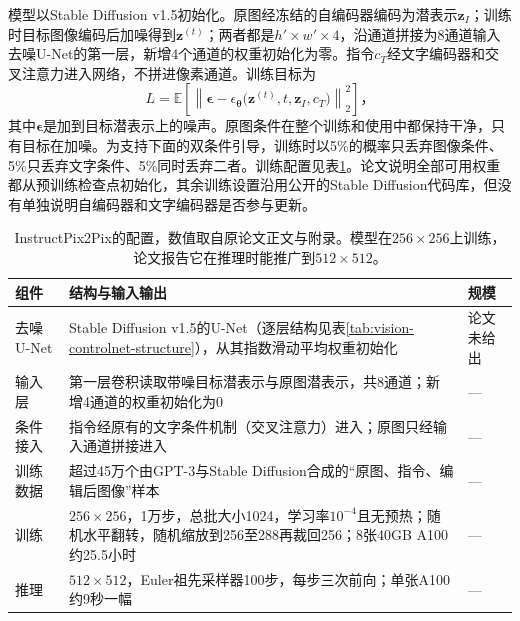 模型以Stable Diffusion v1.5初始化。原图经冻结的自编码器编码为潜表示$\bm{z}_I$；训练时目标图像编码后加噪得到$\bm{z}^{(t)}$；两者都是$h'\times w'\times4$，沿通道拼接为8通道输入去噪U-Net的第一层，新增4个通道的权重初始化为零。指令$c_T$经文字编码器和交叉注意力进入网络，不拼进像素通道。训练目标为
\begin{equation}
 L=\mathbb{E}\!\left[
 \left\lVert\bm{\epsilon}-
 \epsilon_{\bm{\theta}}
   \bigl(\bm{z}^{(t)},t,\bm{z}_I,c_T\bigr)
 \right\rVert_2^2\right]\text{，}
 \label{eq:vision-instruct-training}
\end{equation}
其中$\bm{\epsilon}$是加到目标潜表示上的噪声。原图条件在整个训练和使用中都保持干净，只有目标在加噪。为支持下面的双条件引导，训练时以5\%的概率只丢弃图像条件、5\%只丢弃文字条件、5\%同时丢弃二者。训练配置见表\ref{tab:vision-instruct-config}。论文说明全部可用权重都从预训练检查点初始化，其余训练设置沿用公开的Stable Diffusion代码库，但没有单独说明自编码器和文字编码器是否参与更新。

\begin{table}[htbp]
 \centering
 \small
 \begin{tabularx}{\linewidth}{@{}p{24mm}Xp{20mm}@{}}
  \toprule
  组件 & 结构与输入输出 & 规模\\
  \midrule
  去噪U-Net & Stable Diffusion v1.5的U-Net（逐层结构见表\ref{tab:vision-controlnet-structure}），从其指数滑动平均权重初始化 & 论文未给出\\
  输入层 & 第一层卷积读取带噪目标潜表示与原图潜表示，共8通道；新增4通道的权重初始化为0 & —\\
  条件接入 & 指令经原有的文字条件机制（交叉注意力）进入；原图只经输入通道拼接进入 & —\\
  训练数据 & 超过45万个由GPT-3与Stable Diffusion合成的“原图、指令、编辑后图像”样本 & —\\
  训练 & $256\times256$，1万步，总批大小1024，学习率$10^{-4}$且无预热；随机水平翻转，随机缩放到256至288再裁回256；8张40GB A100约25.5小时 & —\\
  推理 & $512\times512$，Euler祖先采样器100步，每步三次前向；单张A100约9秒一幅 & —\\
  \bottomrule
 \end{tabularx}
 \caption{InstructPix2Pix的配置，数值取自原论文正文与附录。模型在$256\times256$上训练，论文报告它在推理时能推广到$512\times512$。}
 \label{tab:vision-instruct-config}
\end{table}

